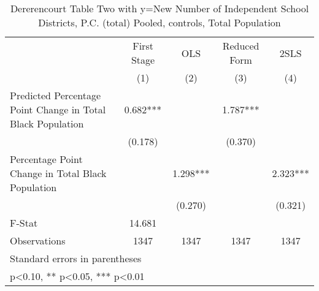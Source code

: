 \begin{table}[htbp]\centering
\def\sym#1{\ifmmode^{#1}\else\(^{#1}\)\fi}
\caption{Dererencourt Table Two with y=New Number of Independent School Districts, P.C. (total)  Pooled,  controls, Total Population}
\begin{tabular}{l*{4}{c}}
\toprule
                    & First Stage   &         OLS   &Reduced Form   &        2SLS   \\
                    &\multicolumn{1}{c}{(1)}   &\multicolumn{1}{c}{(2)}   &\multicolumn{1}{c}{(3)}   &\multicolumn{1}{c}{(4)}   \\
\midrule
Predicted Percentage Point Change in Total Black Population&       0.682***&               &       1.787***&               \\
                    &     (0.178)   &               &     (0.370)   &               \\
\addlinespace
Percentage Point Change in Total Black Population&               &       1.298***&               &       2.323***\\
                    &               &     (0.270)   &               &     (0.321)   \\
\midrule
F-Stat              &      14.681   &               &               &               \\
Observations        &        1347   &        1347   &        1347   &        1347   \\
\bottomrule
\multicolumn{5}{l}{\footnotesize Standard errors in parentheses}\\
\multicolumn{5}{l}{\footnotesize * p<0.10, ** p<0.05, *** p<0.01}\\
\end{tabular}
\end{table}
